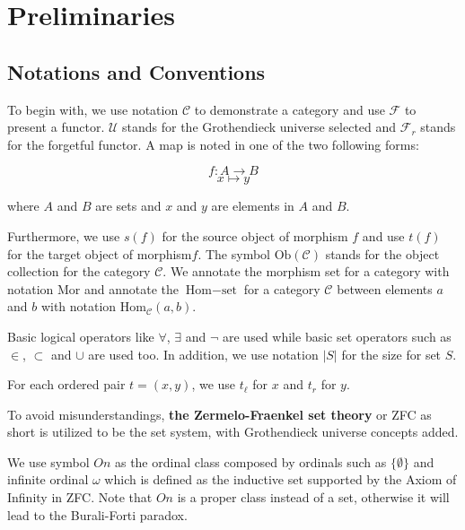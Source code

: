 \documentclass{aims}
\numberwithin{equation}{section}
\numberwithin{theorem}{section}	%
\numberwithin{axiom}{section}	%
\numberwithin{definition}{section}	%
\begin{document}
	\section{Preliminaries}
	
	\subsection{Notations and Conventions}
	
	To begin with, we use notation \(\mathcal{C}\) to demonstrate a category and use \(\mathcal{F}\) to present a functor. \(\mathcal{U}\) stands for the Grothendieck universe selected and \(\mathcal{F}_r\) stands for the forgetful functor. A map is noted in one of the two following forms:
	
	\begin{equation*}
		f: A \to B
	\end{equation*}
	\begin{equation*}
		x\mapsto y
	\end{equation*}
	
	\noindent where \(A\) and \(B\) are sets and \(x\) and \(y\) are elements in \(A\) and \(B\).
	
	Furthermore, we use \(s(f)\) for the source object of morphism \(f\)\textit{  }and use \(t(f)\) for the target object of morphism\(f\). The symbol \(\text{Ob}(\mathcal{C})\) stands for the object collection for the category \(\mathcal{C}\). We annotate the morphism set for a category with notation \(\text{Mor}\) and annotate the \(\text{Hom}-\text{set}\) for a category \(\mathcal{C}\) between elements \(a\) and \(b\) with notation \(\text{Hom}_{\mathcal{C}}(a,b)\).
	
	Basic logical operators like \(\forall\), \(\exists\) and \(\neg\) are used while basic set operators such as \(\in\), \(\subset\) and \(\cup\) are used too. In addition, we use notation \(|S|\) for the size for set \(S\).
	
	For each ordered pair \(t=(x,y)\), we use \(t_{\ell }\) for \(x\) and \(t_{\mathit{r}}\) for \(y\).
	
	To avoid misunderstandings, \textbf{the Zermelo-Fraenkel set theory} or ZFC as short is utilized to be the set system, with Grothendieck universe concepts added. \cite{Li2019}
	
	We use symbol \(On\) as the ordinal class composed by ordinals \cite{Li2019} such as \(\{\emptyset\}\) and infinite ordinal \(\omega\) which is defined as the inductive set supported by the Axiom of Infinity in ZFC. Note that \(On\) is a proper class instead of a set, otherwise it will lead to the Burali-Forti paradox.
	
\end{document}
